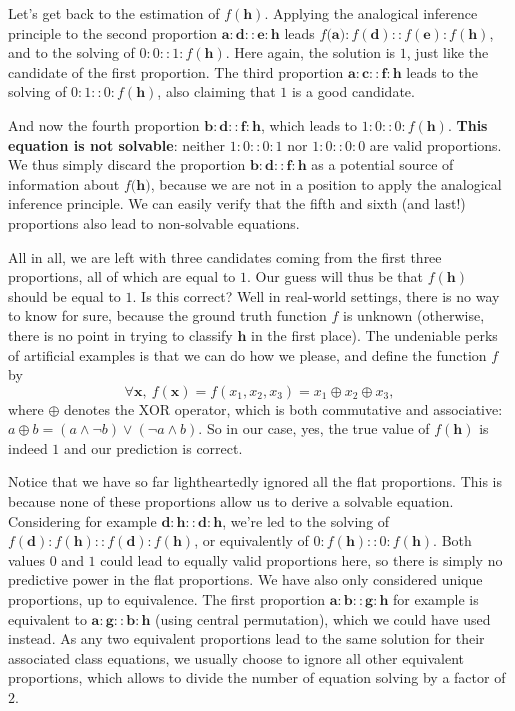 Let's get back to the estimation of $f(\mathbf{h})$. Applying the analogical
inference principle to the second proportion $\mathbf{a} : \mathbf{d} ::
\mathbf{e} : \mathbf{h}$ leads $f(\mathbf{a)} : f(\mathbf{d}) :: f(\mathbf{e})
: f(\mathbf{h})$, and to the solving of $0:0::1:f(\mathbf{h})$. Here again, the
solution is $1$, just like the candidate of the first proportion.
The third proportion  $\mathbf{a} : \mathbf{c} :: \mathbf{f} : \mathbf{h}$
leads to the solving of $0:1::0:f(\mathbf{h})$, also claiming that $1$ is a good candidate.

And now the fourth proportion $\mathbf{b} : \mathbf{d} :: \mathbf{f} :
\mathbf{h}$, which leads to $1:0::0:f(\mathbf{h})$. \textbf{This equation is not
solvable}: neither $1:0::0:1$ nor $1:0::0:0$ are valid proportions. We thus
simply discard the proportion $\mathbf{b} : \mathbf{d} :: \mathbf{f} :
\mathbf{h}$ as a potential source of information about $f(\mathbf{h)}$, because
we are not in a position to apply the analogical inference principle. We can
easily verify that the fifth and sixth (and last!) proportions also lead to
non-solvable equations.

All in all, we are left with three candidates coming from the first three
proportions, all of which are equal to $1$. Our guess will thus be that
$f(\mathbf{h})$ should be equal to $1$. Is this correct? Well in real-world
settings, there is no way to know for sure, because the ground truth function
$f$ is unknown (otherwise, there is no point in trying to classify $\mathbf{h}$
in the first place). The undeniable perks of artificial examples is that we can
do how we please, and define the function $f$ by
$$\forall \mathbf{x}, ~ f(\mathbf{x}) = f(x_1, x_2, x_3) = x_1 \oplus x_2 \oplus x_3,$$
where $\oplus$ denotes the XOR operator, which is both commutative and
associative: $a \oplus b = (a \wedge \neg b) \vee (\neg a \wedge b)$. So in our
case, yes, the true value of $f(\mathbf{h})$ is indeed $1$ and our prediction
is correct.

Notice that we have so far lightheartedly ignored  all the flat proportions.
This is because none of these proportions allow us to derive a solvable
equation. Considering for example $\mathbf{d} : \mathbf{h} :: \mathbf{d} :
\mathbf{h}$, we're led to the solving of $f(\mathbf{d}) : f(\mathbf{h}) ::
f(\mathbf{d}) : f(\mathbf{h})$, or equivalently of $0 : f(\mathbf{h}) :: 0 :
f(\mathbf{h})$. Both values $0$ and $1$ could lead to equally valid proportions
here, so there is simply no predictive power in the flat proportions. We have
also only considered unique proportions, up to equivalence. The first proportion
$\mathbf{a} : \mathbf{b} :: \mathbf{g} : \mathbf{h}$ for example is equivalent
to $\mathbf{a} : \mathbf{g} :: \mathbf{b} : \mathbf{h}$ (using central
permutation), which we could have
used instead. As any two equivalent proportions lead to the same solution for
their associated class equations, we usually choose to ignore all other equivalent
proportions, which allows to divide the number of equation solving by a factor
of $2$.

